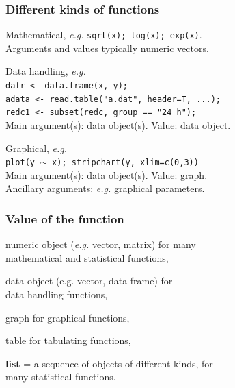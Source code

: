 \documentclass[handout,12pt]{beamer}
\begin{document}
\begin{frame}\frametitle{Different kinds of functions} 
\bi
\item Mathematical, \emph{e.g.} {\tt sqrt(x); log(x); exp(x)}.\\
Arguments and values typically numeric vectors.
\medskip
\item
Data handling, \emph{e.g.} \\
{\tt dafr <- data.frame(x, y); \\
adata <- read.table("a.dat", header=T, ...); \\ %
redc1 <- subset(redc, group == "24 h");}\\
Main argument(s): data object(s). Value: data object.
\medskip
\item 
Graphical, \emph{e.g.} \\
{\tt plot(y $\sim$ x); stripchart(y, xlim=c(0,3))} \\  
Main argument(s): data object(s). Value: graph. \\
Ancillary arguments: \emph{e.g.} graphical parameters.
\ei
\end{frame} 


\begin{frame}\frametitle{Value of the function}
\bi
\item numeric object (\emph{e.g.} vector, matrix) for many \\
  mathematical and statistical functions,
  \medskip
\item data object (e.g. vector, data frame) for \\ data handling functions,
\medskip
\item graph for graphical functions,
\medskip
\item table for tabulating functions,
\medskip
\item {\bf list} = a sequence of objects of different kinds, for \\
many statistical functions.
\ei
\end{frame} 
\end{document}
